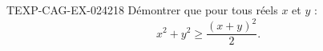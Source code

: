 \begin{exercice}{TEXP-CAG-EX-024}{2}{18}
Démontrer que pour tous réels $x$ et $y$ :
\[ x^2 + y^2 \geq \frac{(x+y)^2}{2}. \]

\end{exercice}
